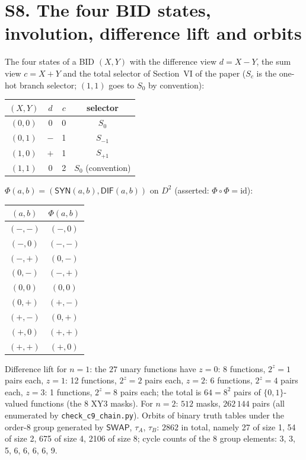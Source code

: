 \documentclass[10pt,a4paper]{article}
\newcommand{\D}{D}\newcommand{\Z}{\mathcal Z}\newcommand{\SYN}{\mathsf{SYN}}\newcommand{\DIF}{\mathsf{DIF}}\newcommand{\OR}{\mathsf{OR}}\newcommand{\XOR}{\mathsf{XOR}}\newcommand{\AND}{\mathsf{AND}}\newcommand{\NOT}{\mathsf{NOT}}\newcommand{\ANT}{\mathsf{ANT}}\newcommand{\MAX}{\mathsf{MAX}}\newcommand{\MIN}{\mathsf{MIN}}\newcommand{\MAG}{\mathsf{MAG}}\newcommand{\chai}{Chai}\newcommand{\Fone}{\mathcal F_1}\newcommand{\Ftwo}{\mathcal F_2}\usepackage{tikz}\usetikzlibrary{arrows.meta,positioning}\newcommand{\yang}{\rule{0.8em}{0.18ex}}\newcommand{\yin}{\rule{0.25em}{0.18ex}\hspace{0.3em}\rule{0.25em}{0.18ex}}\newcommand{\tri}[3]{\raisebox{-0.01ex}{\shortstack[c]{#1\\[-0.3ex]#2\\[-0.3ex]#3}}}\newcommand{\iv}[1]{[\![#1]\!]}
\begin{document}
\section*{S8. The four BID states, involution, difference lift and orbits}
The four states of a BID $(X,Y)$ with the difference view $d=X-Y$, the sum view $c=X+Y$ and the total selector of Section~VI of the paper ($S_c$ is the one-hot branch selector; $(1,1)$ goes to $S_0$ by convention):
\begin{center}\small\begin{tabular}{cccc}\toprule $(X,Y)$&$d$&$c$&selector\\\midrule
$(0,0)$&$0$&0&$S_0$\\ $(0,1)$&$-$&1&$S_{-1}$\\ $(1,0)$&$+$&1&$S_{+1}$\\ $(1,1)$&$0$&2&$S_0$ (convention)\\
\bottomrule\end{tabular}\end{center}
$\Phi(a,b)=(\SYN(a,b),\DIF(a,b))$ on $\D^2$ (asserted: $\Phi\circ\Phi=\mathrm{id}$):
\begin{center}\small\begin{tabular}{cc}$(a,b)$&$\Phi(a,b)$\\\hline $(-,-)$&$(-,0)$\\$(-,0)$&$(-,-)$\\$(-,+)$&$(0,-)$\\$(0,-)$&$(-,+)$\\$(0,0)$&$(0,0)$\\$(0,+)$&$(+,-)$\\$(+,-)$&$(0,+)$\\$(+,0)$&$(+,+)$\\$(+,+)$&$(+,0)$\\\end{tabular}\end{center}
Difference lift for $n=1$: the $27$ unary functions have $z=0$: 8 functions, $2^z=1$ pairs each, $z=1$: 12 functions, $2^z=2$ pairs each, $z=2$: 6 functions, $2^z=4$ pairs each, $z=3$: 1 functions, $2^z=8$ pairs each; the total is $64=8^2$ pairs of $\{0,1\}$-valued functions (the $8$ XY3 masks). For $n=2$: $512$ masks, $262\,144$ pairs (all enumerated by \texttt{check\_c9\_chain.py}).
Orbits of binary truth tables under the order-$8$ group generated by $\mathsf{SWAP}$, $\tau_A$, $\tau_B$: $2862$ in total, namely 27 of size 1, 54 of size 2, 675 of size 4, 2106 of size 8; cycle counts of the $8$ group elements: 3, 3, 5, 6, 6, 6, 6, 9.
\end{document}
